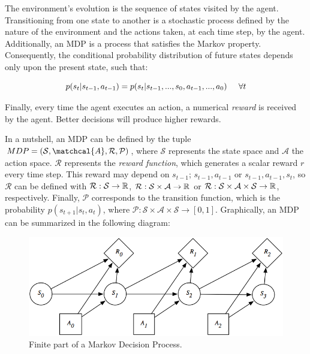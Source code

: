 The environment's evolution is the sequence of states visited by the agent. Transitioning from one state to another is a stochastic process defined by the nature of the environment and the actions taken, at each time step, by the agent. Additionally, an MDP is a process that satisfies the Markov property. Consequently, the conditional probability distribution of future states depends only upon the present state, such that:

\begin{equation}
    p(s_{t}|s_{t-1}, a_{t-1}) = p(s_{t}|s_{t-1},...,s_{0},a_{t-1},...,a_{0})  \hspace{0.5cm} \forall t
\end{equation}

Finally, every time the agent executes an action, a numerical \emph{reward} is received by the agent. Better decisions will produce higher rewards.

In a nutshell, an MDP can be defined by the tuple $MDP=(\mathcal{S},\matchcal{A},\mathcal{R},\mathcal{P})$, where $\mathcal{S}$ represents the state space and $\mathcal{A}$ the action space. $\mathcal{R}$ represents the \emph{reward function}, which generates a scalar reward $r$ every time step. This reward may depend on $s_{t-1}$; $s_{t-1},a_{t-1}$ or $s_{t-1},a_{t-1},s_{t}$, so $\mathcal{R}$ can be defined with $\mathcal{R}: \mathcal{S} \to \mathbb{R}$, $\mathcal{R}: \mathcal{S} \times \mathcal{A} \to \mathbb{R}$ or $\mathcal{R}: \mathcal{S} \times \mathcal{A} \times \mathcal{S} \to \mathbb{R}$, respectively. Finally, $\mathcal{P}$ corresponds to the transition function, which is the probability $p(s_{t+1}|s_{t}, a_{t})$, where $\mathcal{P}: \mathcal{S} \times \mathcal{A} \times \mathcal{S} \to [0, 1]$. Graphically, an MDP can be summarized in the following diagram:

\begin{figure}[H]
    \centering
    \includegraphics[width=0.7\linewidth]{imagenes/cap1/mdp.png}
    \caption{Finite part of a Markov Decision Process.\protect\footnotemark}
    \label{fig:msim}
\end{figure}

